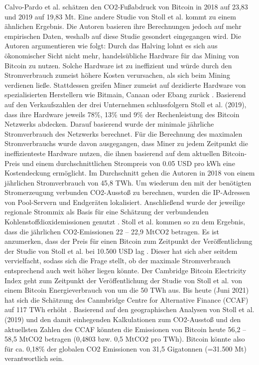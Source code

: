 	Calvo-Pardo et al. \cite{calvo-pardo_machine_2020} schätzen den CO2-Fußabdruck von Bitcoin in 2018 auf 23,83 und 2019 auf 19,83 Mt. Eine andere Studie von Stoll et al. \cite{stoll_carbon_2019} kommt zu einem ähnlichen Ergebnis. Die Autoren basieren ihre Berechnungen jedoch auf mehr empirischen Daten, weshalb auf diese Studie gesondert eingegangen wird. Die Autoren argumentieren wie folgt: Durch das Halving lohnt es sich aus ökonomischer Sicht nicht mehr, handelsübliche Hardware für das Mining von Bitcoin zu nutzen. Solche Hardware ist zu ineffizient und würde durch den Stromverbrauch zumeist höhere Kosten verursachen, als sich beim Mining verdienen ließe. Stattdessen greifen Miner zumeist auf dezidierte Hardware von spezialisierten Herstellern wie Bitmain, Canaan oder Ebang zurück \cite{stoll_carbon_2019}. Basierend auf den Verkaufszahlen der drei Unternehmen schlussfolgern Stoll et al. (2019), dass ihre Hardware jeweils 78\%, 13\% und 9\% der Rechenleistung des Bitcoin Netzwerks abdecken. Darauf basierend wurde der minimale jährliche Stromverbrauch des Netzwerks berechnet. Für die Berechnung des maximalen Stromverbrauchs wurde davon ausgegangen, dass Miner zu jedem Zeitpunkt die ineffizienteste Hardware nutzen, die ihnen basierend auf dem aktuellen Bitcoin-Preis und einem durchschnittlichen Strompreis von 0.05 USD pro kWh eine Kostendeckung ermöglicht. Im Durchschnitt gehen die Autoren in 2018 von einem jährlichen Stromverbrauch von 45,8 TWh. Um wiederum den mit der benötigten Stromerzeugung verbunden CO2-Ausstoß zu berechnen, wurden die IP-Adressen von Pool-Servern und Endgeräten lokalisiert. Anschließend wurde der jeweilige regionale Strommix als Basis für eine Schätzung der verbundenden Kohlenstoffdioxidemissionen genutzt \cite{stoll_carbon_2019}. Stoll et al. \cite{stoll_carbon_2019} kommen so zu dem Ergebnis, dass die jährlichen CO2-Emissionen 22 – 22,9 MtCO2 betragen. Es ist anzumerken, dass der Preis für einen Bitcoin zum Zeitpunkt der Veröffentlichung der Studie von Stoll et al. \cite{stoll_carbon_2019} bei 10.500 USD lag \cite{noauthor_coindesk_2021}. Dieser hat sich aber seitdem vervielfacht, sodass sich die Frage stellt, ob der maximale Stromverbrauch entsprechend auch weit höher liegen könnte. Der Cambridge Bitcoin Electricity Index geht zum Zeitpunkt der Veröffentlichung der Studie von Stoll et al. \cite{stoll_carbon_2019} von einem Bitcoin Energieverbrauch von um die 50 TWh aus. Bis heute (Juni 2021) hat sich die Schätzung des Canmbridge Centre for Alternative Finance (CCAF) auf 117 TWh erhöht \cite{cambridge_cambridge_2021}. Basierend auf den geographischen Analysen von Stoll et al. (2019) und den damit einhegenden Kalkulationen zum CO2-Ausstoß und den aktuellsten Zahlen des CCAF könnten die Emissionen von Bitcoin heute 56,2 – 58,5 MtCO2 betragen (0,4803 bzw. 0,5 MtCO2 pro TWh). Bitcoin könnte also für ca. 0,18\% der globalen CO2 Emissionen von 31,5 Gigatonnen (=31.500 Mt) \cite{IEA_global_2021} verantwortlich sein. \newline
	
